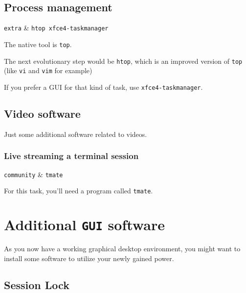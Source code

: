 \documentclass[10pt]{dustdoc}
\begin{document}
\subsection{Process management}
\label{sec:process-management}

\begin{packagetable}
    \texttt{extra} & \texttt{htop xfce4-taskmanager} \\ 
\end{packagetable}

The native tool is \texttt{top}.

The next evolutionary step would be \texttt{htop}, which is an improved version of \texttt{top} (like \texttt{vi} and \texttt{vim} for example)

If you prefer a GUI for that kind of task, use \texttt{xfce4-taskmanager}.

\subsection{Video software}
\label{sec:console-video-software}

Just some additional software related to videos.

\subsubsection{Live streaming a terminal session}
\label{sec:live-streaming-a-terminal-session}

\begin{packagetable}
    \texttt{community} & \texttt{tmate} \\ 
\end{packagetable}

For this task, you’ll need a program called \texttt{tmate}.

\section{Additional \texttt{GUI} software}
\label{sec:additional-gui-software}

As you now have a working graphical desktop environment, you might want to install some software to utilize your newly gained power.

\subsection{Session Lock}
\label{sec:session-lock}
\end{document}
